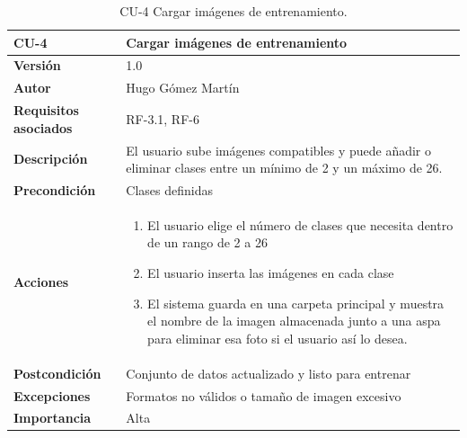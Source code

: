 \begin{table}[p]
	\centering
	\begin{tabularx}{\linewidth}{ p{} p{} }
		\toprule
		\textbf{CU-4}    & \textbf{Cargar imágenes de entrenamiento}\\
		\toprule
		\textbf{Versión}              & 1.0    \\
		\textbf{Autor}                & Hugo Gómez Martín \\
		\textbf{Requisitos asociados} & RF-3.1, RF-6 \\
		\textbf{Descripción}          & El usuario sube imágenes compatibles y puede añadir o eliminar clases entre un mínimo de 2 y un máximo de 26. \\
		\textbf{Precondición}         & Clases definidas \\
		\textbf{Acciones}             &
		\begin{enumerate}
			\def\labelenumi{\arabic{enumi}.}
			\tightlist
			\item El usuario elige el número de clases que necesita dentro de un rango de 2 a 26
			\item El usuario inserta las imágenes en cada clase
                \item El sistema guarda en una carpeta principal y muestra el nombre de la imagen almacenada junto a una aspa para eliminar esa foto si el usuario así lo desea.
                
		\end{enumerate}\\
		\textbf{Postcondición}        & Conjunto de datos actualizado y listo para entrenar \\
		\textbf{Excepciones}          & Formatos no válidos o tamaño de imagen excesivo \\
		\textbf{Importancia}          & Alta  \\
		\bottomrule
	\end{tabularx}
	\caption{CU-4 Cargar imágenes de entrenamiento.}
\end{table}

